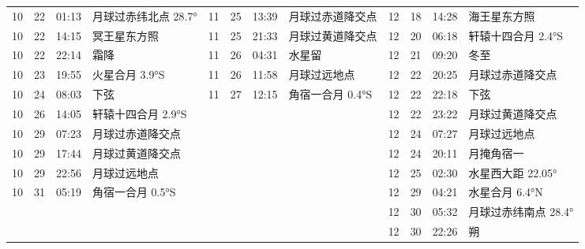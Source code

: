 \begin{tabular}{llll|llll|llll}
10 & 22 & 01:13 & 月球过赤纬北点 28.7° & 11 & 25 & 13:39 & 月球过赤道降交点 & 12 & 18 & 14:28 & 海王星东方照 \tabularnewline
10 & 22 & 14:15 & 冥王星东方照 & 11 & 25 & 21:33 & 月球过黄道降交点 & 12 & 20 & 06:18 & 轩辕十四合月 2.4°S \tabularnewline
10 & 22 & 22:14 & 霜降 & 11 & 26 & 04:31 & 水星留 & 12 & 21 & 09:20 & 冬至 \tabularnewline
10 & 23 & 19:55 & 火星合月 3.9°S & 11 & 26 & 11:58 & 月球过远地点 & 12 & 22 & 20:25 & 月球过赤道降交点 \tabularnewline
10 & 24 & 08:03 & 下弦 & 11 & 27 & 12:15 & 角宿一合月 0.4°S & 12 & 22 & 22:18 & 下弦 \tabularnewline
10 & 26 & 14:05 & 轩辕十四合月 2.9°S &  &  &  &  & 12 & 22 & 23:22 & 月球过黄道降交点 \tabularnewline
10 & 29 & 07:23 & 月球过赤道降交点 &  &  &  &  & 12 & 24 & 07:27 & 月球过远地点 \tabularnewline
10 & 29 & 17:44 & 月球过黄道降交点 &  &  &  &  & 12 & 24 & 20:11 & 月掩角宿一 \tabularnewline
10 & 29 & 22:56 & 月球过远地点 &  &  &  &  & 12 & 25 & 02:30 & 水星西大距 22.05° \tabularnewline
10 & 31 & 05:19 & 角宿一合月 0.5°S &  &  &  &  & 12 & 29 & 04:21 & 水星合月 6.4°N \tabularnewline
 &  &  &  &  &  &  &  & 12 & 30 & 05:32 & 月球过赤纬南点 28.4° \tabularnewline
 &  &  &  &  &  &  &  & 12 & 30 & 22:26 & 朔 \tabularnewline
\hline \end{tabular}
